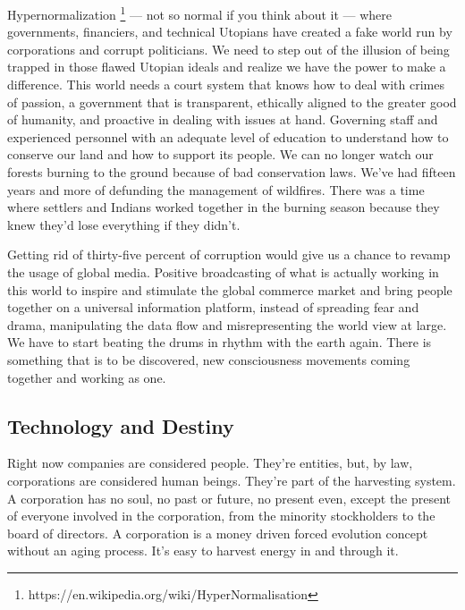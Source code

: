 Hypernormalization \footnote{https://en.wikipedia.org/wiki/HyperNormalisation}
--- not so normal if you think about it --- where governments,
financiers, and technical Utopians have created a fake world run by
corporations and corrupt politicians. We need to step out of the
illusion of being trapped in those flawed Utopian ideals and realize we
have the power to make a difference. This world needs a court system
that knows how to deal with crimes of passion, a government that is
transparent, ethically aligned to the greater good of humanity, and
proactive in dealing with issues at hand. Governing staff and
experienced personnel with an adequate level of education to understand
how to conserve our land and how to support its people. We can no longer
watch our forests burning to the ground because of bad conservation
laws. We've had fifteen years and more of defunding the management of
wildfires. There was a time where settlers and Indians worked together
in the burning season because they knew they'd lose everything if they
didn't.

Getting rid of thirty-five percent of corruption would give us a chance
to revamp the usage of global media. Positive broadcasting of what is
actually working in this world to inspire and stimulate the global
commerce market and bring people together on a universal information
platform, instead of spreading fear and drama, manipulating the data
flow and misrepresenting the world view at large. We have to start
beating the drums in rhythm with the earth again. There is something
that is to be discovered, new consciousness movements coming together
and working as one.

\subsection{Technology and Destiny}\label{technology-and-destiny}

Right now companies are considered people. They're entities, but, by
law, corporations are considered human beings. They're part of the
harvesting system. A corporation has no soul, no past or future, no
present even, except the present of everyone involved in the
corporation, from the minority stockholders to the board of directors. A
corporation is a money driven forced evolution concept without an aging
process. It's easy to harvest energy in and through it.

